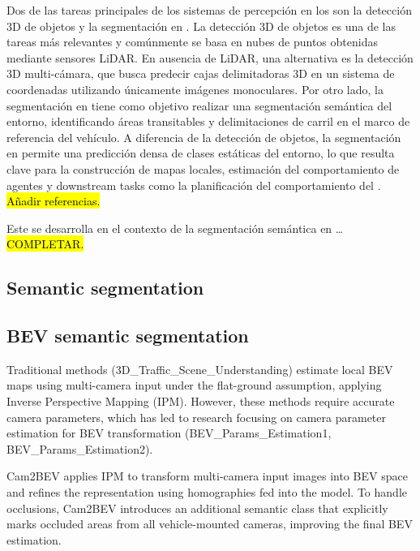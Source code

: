 Dos de las tareas principales de los sistemas de percepción en los  son la detección 3D de objetos y la segmentación en . La detección 3D de objetos es una de las tareas más relevantes y comúnmente se basa en nubes de puntos obtenidas mediante sensores LiDAR. En ausencia de LiDAR, una alternativa es la detección 3D multi-cámara, que busca predecir cajas delimitadoras 3D en un sistema de coordenadas  utilizando únicamente imágenes monoculares. Por otro lado, la segmentación en  tiene como objetivo realizar una segmentación semántica del entorno, identificando áreas transitables y delimitaciones de carril en el marco de referencia del vehículo. A diferencia de la detección de objetos, la segmentación en  permite una predicción densa de clases estáticas del entorno, lo que resulta clave para la construcción de mapas locales, estimación del comportamiento de agentes y downstream tasks como la planificación del comportamiento del . \hl{Añadir referencias.}

Este  se desarrolla en el contexto de la segmentación semántica en \dots \hl{COMPLETAR.}


\subsection{Semantic segmentation}
\lipsum[2-4] %

\subsection{BEV semantic segmentation}

%

Traditional methods (3D\_Traffic\_Scene\_Understanding) estimate local BEV maps using multi-camera input under the flat-ground assumption, applying Inverse Perspective Mapping (IPM). However, these methods require accurate camera parameters, which has led to research focusing on camera parameter estimation for BEV transformation (BEV\_Params\_Estimation1, BEV\_Params\_Estimation2).

Cam2BEV applies IPM to transform multi-camera input images into BEV space and refines the representation using homographies fed into the model. To handle occlusions, Cam2BEV introduces an additional semantic class that explicitly marks occluded areas from all vehicle-mounted cameras, improving the final BEV estimation.

